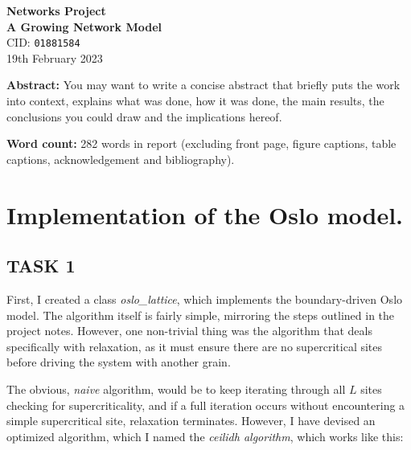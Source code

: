 \documentclass[a4paper,12pt]{article}
\begin{document}

\begin{center}
 {\Large\textbf{Networks Project}}  \\[3pt]
 {\Large\textbf{A Growing Network Model}} \\[6pt]
 {\large CID: \texttt{01881584}} \\[3pt]
 19th February 2023
\end{center}



\vspace*{2cm}
\noindent
{\bf Abstract:} You may want to write a concise abstract that briefly puts the
work into context, explains what was done, how it was done, the main results,
the conclusions you could draw and the implications hereof.

\vspace*{2cm}
\noindent
{\bf Word count:}
282 words in report (excluding front page, figure captions, table captions, acknowledgement and bibliography).


\newpage


\section{Implementation of the Oslo model.}

\subsection{TASK 1}

First, I created a class \textit{oslo\_lattice}, which implements the boundary-driven Oslo model. The algorithm itself is fairly simple, mirroring the steps outlined in the project notes. However, one non-trivial thing was the algorithm that deals specifically with relaxation, as it must ensure there are no supercritical sites before driving the system with another grain.

The obvious, \textit{naive} algorithm, would be to keep iterating through all $L$ sites checking for supercriticality, and if a full iteration occurs without encountering a simple supercritical site, relaxation terminates. However, I have devised an optimized algorithm, which I named the \textit{ceilidh algorithm}, which works like this:
\end{document}
